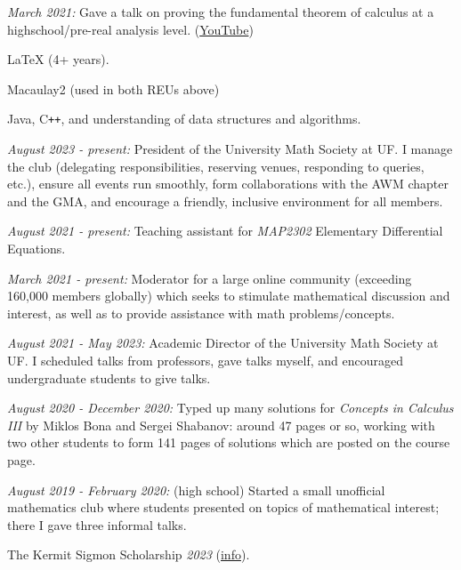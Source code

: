 \documentclass[11pt]{article}
\begin{document}
\textsl{March 2021:} Gave a talk on proving the fundamental theorem of calculus at a highschool/pre-real analysis level. ({\color{blue}\href{https://youtu.be/l4GO-n-2ETQ}{YouTube}})



\LaTeX\hspace{1pt} (4+ years).

Macaulay2 (used in both REUs above)

Java, C\verb!++!, and understanding of data structures and algorithms. 


\textsl{August 2023 - present:} President of the University Math Society at UF. I manage the club (delegating responsibilities, reserving venues, responding to queries, etc.), ensure all events run smoothly, form collaborations with the AWM chapter and the GMA, and encourage a friendly, inclusive environment for all members.

\textsl{August 2021 - present:} Teaching assistant for \textsl{MAP2302} Elementary Differential Equations.

\textsl{March 2021 - present:} Moderator for a large online community (exceeding 160,000 members globally) which seeks to stimulate mathematical discussion and interest, as well as to provide assistance with math problems/concepts.

\textsl{August 2021 - May 2023:} Academic Director of the University Math Society at UF. I scheduled talks from professors, gave talks myself, and encouraged undergraduate students to give talks.

\textsl{August 2020 - December 2020:} Typed up many solutions for \textsl{Concepts in Calculus
III} by Miklos Bona and Sergei Shabanov: around 47 pages or so, working with two other students to form 141 pages of solutions which are posted on the course page.

\textsl{August 2019 - February 2020:} (high school) Started a small unofficial mathematics club  where students presented on topics of mathematical interest; there I gave three informal talks.


The Kermit Sigmon Scholarship \textsl{2023} ({\color{blue}\href{https://math.ufl.edu/mathematics-major/opportunities-for-undergraduates/the-kermit-sigmon-scholarship/}{info}}).
\end{document}
